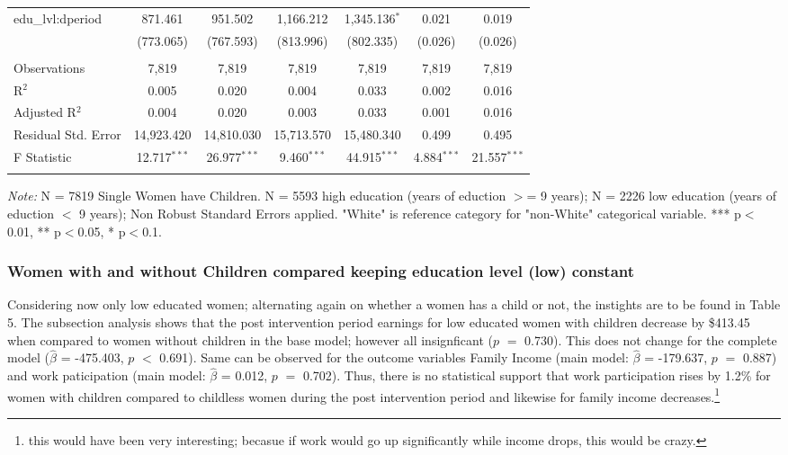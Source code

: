 \documentclass[a4paper]{article}
\begin{document}
\begin{table}[!htbp]
\begin{adjustwidth}{0.cm}{-0cm}
\begin{threeparttable}
\begin{tabular}{@{\extracolsep{-2pt}}lcccccc}
  edu\_lvl:dperiod & 871.461 & 951.502 & 1,166.212 & 1,345.136$^{*}$ & 0.021 & 0.019 \\ 
  & (773.065) & (767.593) & (813.996) & (802.335) & (0.026) & (0.026) \\ 
 \hline \\[-1.8ex] 
Observations & 7,819 & 7,819 & 7,819 & 7,819 & 7,819 & 7,819 \\ 
R$^{2}$ & 0.005 & 0.020 & 0.004 & 0.033 & 0.002 & 0.016 \\ 
Adjusted R$^{2}$ & 0.004 & 0.020 & 0.003 & 0.033 & 0.001 & 0.016 \\ 
Residual Std. Error & 14,923.420& 14,810.030 & 15,713.570 & 15,480.340  & 0.499  & 0.495 \\ 
F Statistic & 12.717$^{***}$  & 26.977$^{***}$ & 9.460$^{***}$ & 44.915$^{***}$  & 4.884$^{***}$  & 21.557$^{***}$  \\ 
\hline 
\hline \\[-3.5ex] 
\end{tabular} 
\begin{tablenotes}
      \small
      \item\textit{Note:} N = 7819 Single Women have Children. N = 5593 high education (years of eduction $>$= 9 years); N = 2226 low education (years of eduction $<$ 9 years); Non Robust Standard Errors applied. "White" is reference category for "non-White" categorical variable. *** p$<$0.01, ** p$<$0.05, * p$<$0.1.
    \end{tablenotes}
\end{threeparttable}
\end{adjustwidth}
%
\end{table}

\subsubsection{Women with and without Children compared keeping education level (low) constant}

Considering now only low educated women; alternating again on whether a women has a child or not, the instights are to be found in Table 5. 
The subsection analysis shows that the post intervention period earnings for low educated women with children decrease by \$413.45 when compared to women without children in the base model; however all insignficant ($p$ $=$ 0.730). This does not change for the complete model ($\hat{\beta}$ = -475.403, $p$ $<$ 0.691). Same can be observed for the outcome variables Family Income (main model: $\hat{\beta}$ = -179.637, $p$ $=$ 0.887) and work paticipation (main model: $\hat{\beta}$ = 0.012, $p$ $=$ 0.702). Thus, there is no statistical support that work participation rises by 1.2\% for women with children compared to childless women during the post intervention period and likewise for family income decreases.\footnote{this would have been very interesting; becasue if work would go up significantly while income drops, this would be crazy.}
\end{document}
